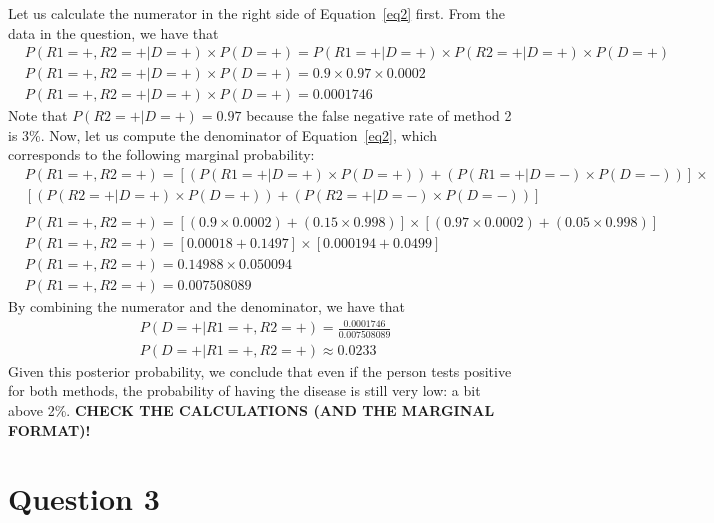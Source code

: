 \documentclass[leqno]{article}
\begin{document}
\noindent Let us calculate the numerator in the right side of Equation~\ref{eq2} first. From
the data in the question, we have that
\begin{equation*}
\begin{split}
&P(R1 = +, R2 = +| D = +) \times P(D = +) = P(R1 = +|D = +) \times P(R2 = +| D = +) \times P(D = +)
\\
&P(R1 = +, R2 = +| D = +) \times P(D = +) = 0.9 \times 0.97 \times 0.0002
\\
&P(R1 = +, R2 = +| D = +) \times P(D = +) = 0.0001746
\end{split}  
\end{equation*}  
Note that $P(R2 = +| D = +) = 0.97$ because the false negative rate of method 2 is 3\%. Now, let us
compute the denominator of Equation~\ref{eq2}, which corresponds to the following marginal
probability:
\begin{equation*}
\begin{split}
&P(R1 = +, R2 = +) = [(P(R1 = +|D = +) \times P(D = +)) + (P(R1 = +|D = -) \times P(D = -))] \times
\\
&[(P(R2 = +|D = +) \times P(D = +)) + (P(R2 = +|D = -) \times P(D = -))]
\\
\\
&P(R1 = +, R2 = +) = [(0.9 \times 0.0002) + (0.15 \times 0.998)] \times [(0.97 \times 0.0002) + (0.05 \times 0.998)]
\\
&P(R1 = +, R2 = +) = [0.00018 + 0.1497] \times [0.000194 + 0.0499]
\\
&P(R1 = +, R2 = +) = 0.14988 \times 0.050094
\\
&P(R1 = +, R2 = +) = 0.007508089
\end{split}  
\end{equation*}
By combining the numerator and the denominator, we have that
\begin{equation*}
\begin{split}
&P(D = +| R1 = +, R2 = +) = \frac{0.0001746}{0.007508089}
\\
&P(D = +| R1 = +, R2 = +) \approx 0.0233
\end{split}  
\end{equation*}
Given this posterior probability, we conclude that even if the person tests positive for both methods, the probability of having the
disease is still very low: a bit above 2\%. \textbf{CHECK THE CALCULATIONS (AND THE MARGINAL FORMAT)!}

\section*{Question 3}
\end{document}
